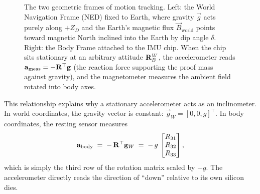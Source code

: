 \begin{figure}[H]
\caption{The two geometric frames of motion tracking. Left: the World Navigation Frame (NED) fixed to Earth, where gravity $\vec{g}$ acts purely along $+Z_D$ and the Earth's magnetic flux $\vec{B}_{\text{world}}$ points toward magnetic North inclined into the Earth by dip angle $\delta$. Right: the Body Frame attached to the IMU chip. When the chip sits stationary at an arbitrary attitude $\mathbf{R}_B^W$, the accelerometer reads $\mathbf{a}_{\text{meas}} = -\mathbf{R}^\top \mathbf{g}$ (the reaction force supporting the proof mass against gravity), and the magnetometer measures the ambient field rotated into body axes.}
\label{ch34:fig-ned-body}
\end{figure}

This relationship explains why a stationary accelerometer acts as an inclinometer.
In world coordinates, the gravity vector is constant: $\vec{g}_W = [0, 0, g]^\top$. In body
coordinates, the resting sensor measures
\begin{equation}
\label{ch34:eq-accel-body}
  \mathbf{a}_{\text{body}} \;=\; -\,\mathbf{R}^\top \mathbf{g}_W \;=\; -\,g\,
  \begin{bmatrix} R_{31} \\ R_{32} \\ R_{33} \end{bmatrix},
\end{equation}
which is simply the third row of the rotation matrix scaled by $-g$. The accelerometer
directly reads the direction of ``down'' relative to its own silicon dies.

